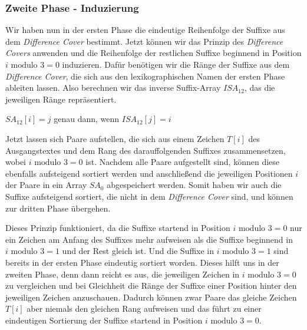 \subsubsection{Zweite Phase - Induzierung}
\label{dc3:algorithmus:phase2}

Wir haben nun in der ersten Phase die eindeutige Reihenfolge der Suffixe aus dem \emph{Difference Cover} bestimmt. Jetzt können wir das Prinzip des \emph{Difference Covers} anwenden und die Reihenfolge der restlichen Suffixe beginnend in Position $i \text{ modulo } 3 = 0$ induzieren. Dafür benötigen wir die Ränge der Suffixe aus dem \emph{Difference Cover}, die sich aus den lexikographischen Namen der ersten Phase ableiten lassen. Also berechnen wir das inverse Suffix-Array $ISA_{12}$, das die jeweiligen Ränge repräsentiert.
\begin{center}
	$SA_{12}[i] = j$ genau dann, wenn $ISA_{12}[j] = i$
\end{center}
Jetzt lassen sich Paare aufstellen, die sich aus einem Zeichen $T[i]$ des Aus\-gangs\-text\-es und dem Rang des darauffolgenden Suffixes zusammensetzen, wobei $i \text{ modulo } 3 = 0$ ist. Nachdem alle Paare aufgestellt sind, können diese ebenfalls aufsteigend sortiert werden und anschließend die jeweiligen Positionen $i$ der Paare in ein Array $SA_0$ abgespeichert werden. Somit haben wir auch die Suffixe aufsteigend sortiert, die nicht in dem \emph{Difference Cover} sind, und können zur dritten Phase übergehen.

Dieses Prinzip funktioniert, da die Suffixe startend in Position $i \text{ modulo } 3 = 0$ nur ein Zeichen am Anfang des Suffixes mehr aufweisen als die Suffixe beginnend in $i \text{ modulo } 3 = 1$ und der Rest gleich ist. Und die Suffixe in $i \text{ modulo } 3 = 1$ sind bereits in der ersten Phase eindeutig sortiert worden. Dieses hilft uns in der zweiten Phase, denn dann reicht es aus, die jeweiligen Zeichen in $i \text{ modulo } 3 = 0$ zu vergleichen und bei Gleichheit die Ränge der Suffixe einer Position hinter den jeweiligen Zeichen anzuschauen. Dadurch können zwar Paare das gleiche Zeichen $T[i]$ aber niemals den gleichen Rang aufweisen und das führt zu einer eindeutigen Sortierung der Suffixe startend in Position $i \text{ modulo } 3 = 0$.